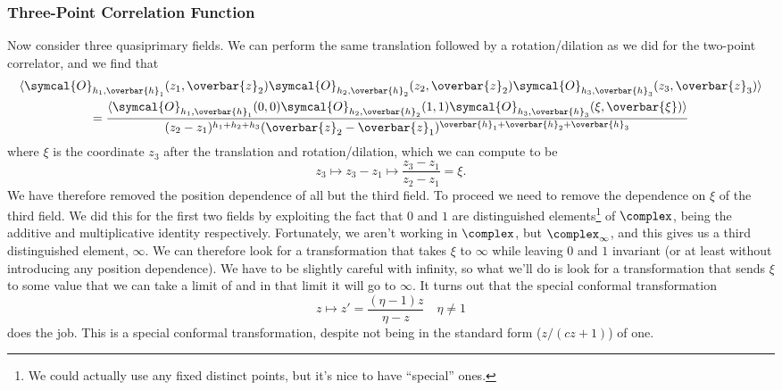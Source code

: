 \documentclass[fleqn]{NotesClass}
\newcommand{\quantumField}[1]{\symcal{#1}}
\DeclarePairedDelimiter{\correlator}{\langle}{\rangle}
\begin{document}
    \subsubsection{Three-Point Correlation Function}
    Now consider three quasiprimary fields.
    We can perform the same translation followed by a rotation/dilation as we did for the two-point correlator, and we find that
    \begin{multline}
        \correlator{\quantumField{O}_{h_1,\overbar{h}_1}(z_1, \overbar{z}_2) \quantumField{O}_{h_2,\overbar{h}_2}(z_2, \overbar{z}_2) \quantumField{O}_{h_3,\overbar{h}_3}(z_3, \overbar{z}_3)}\\
        = \frac{\correlator{\quantumField{O}_{h_1,\overbar{h}_1}(0, 0) \quantumField{O}_{h_2,\overbar{h}_2}(1, 1) \quantumField{O}_{h_3, \overbar{h}_3}(\xi, \overbar{\xi})}}{(z_2 - z_1)^{h_1 + h_2 + h_3}(\overbar{z}_2 - \overbar{z}_1)^{\overbar{h}_1 + \overbar{h}_2 + \overbar{h}_3}}
    \end{multline}
    where \(\xi\) is the coordinate \(z_3\) after the translation and rotation/dilation, which we can compute to be
    \begin{equation}
        z_3 \mapsto z_3 - z_1 \mapsto \frac{z_3 - z_1}{z_2 - z_1} = \xi.
    \end{equation}
    We have therefore removed the position dependence of all but the third field.
    To proceed we need to remove the dependence on \(\xi\) of the third field.
    We did this for the first two fields by exploiting the fact that \(0\) and \(1\) are distinguished elements\footnote{We could actually use any fixed distinct points, but it's nice to have \enquote{special} ones.} of \(\complex\), being the additive and multiplicative identity respectively.
    Fortunately, we aren't working in \(\complex\), but \(\complex_{\infty}\), and this gives us a third distinguished element, \(\infty\).
    We can therefore look for a transformation that takes \(\xi\) to \(\infty\) while leaving \(0\) and \(1\) invariant (or at least without introducing any position dependence).
    We have to be slightly careful with infinity, so what we'll do is look for a transformation that sends \(\xi\) to some value that we can take a limit of and in that limit it will go to \(\infty\).
    It turns out that the special conformal transformation
    \begin{equation}
        z \mapsto z' = \frac{(\eta - 1)z}{\eta - z} \quad \eta \ne 1
    \end{equation}
    does the job.
    This is a special conformal transformation, despite not being in the standard form (\(z/(cz + 1)\)) of one.
\end{document}
